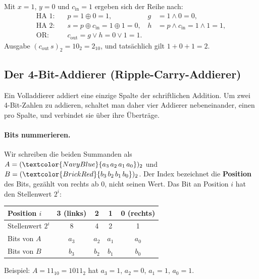 \begin{myexample}
    Mit $x = 1$, $y = 0$ und $c_{\text{in}} = 1$ ergeben sich der Reihe nach:
    \begin{align*}
        \text{HA 1:} \quad & p = 1 \oplus 0 = 1,                           & g & = 1 \land 0 = 0, \\
        \text{HA 2:} \quad & s = p \oplus c_{\text{in}} = 1 \oplus 1 = 0, & h & = p \land c_{\text{in}} = 1 \land 1 = 1, \\
        \text{OR:}   \quad & c_{\text{out}} = g \lor h = 0 \lor 1 = 1.
    \end{align*}
    Ausgabe $(c_{\text{out}}\,s)_2 = 10_2 = 2_{10}$, und tatsächlich gilt $1 + 0 + 1 = 2$.
\end{myexample}

\subsection{Der 4-Bit-Addierer (Ripple-Carry-Addierer)}\label{sec:4bit_addierer}

Ein Volladdierer addiert eine einzige Spalte der schriftlichen Addition. Um zwei 4-Bit-Zahlen zu addieren, schaltet man daher vier Addierer nebeneinander, einen pro Spalte, und verbindet sie über ihre Überträge.

\paragraph{Bits nummerieren.}
Wir schreiben die beiden Summanden als $A = (\textcolor{NavyBlue}{a_3\,a_2\,a_1\,a_0})_2$ und $B = (\textcolor{BrickRed}{b_3\,b_2\,b_1\,b_0})_2$. Der Index bezeichnet die \textbf{Position} des Bits, gezählt von rechts ab $0$, nicht seinen Wert. Das Bit an Position $i$ hat den Stellenwert $2^i$:
\begin{center}
    \begin{tabular}{lcccc}
        Position $i$           & 3 (links) & 2     & 1     & 0 (rechts) \\ \midrule
        Stellenwert $2^i$      & 8         & 4     & 2     & 1          \\
        Bits von $A$           & $a_3$     & $a_2$ & $a_1$ & $a_0$      \\
        Bits von $B$           & $b_3$     & $b_2$ & $b_1$ & $b_0$      \\
    \end{tabular}
\end{center}
Beispiel: $A = 11_{10} = 1011_2$ hat $a_3 = 1$, $a_2 = 0$, $a_1 = 1$, $a_0 = 1$.

